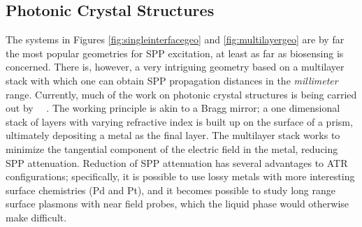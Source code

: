 \subsection{Photonic Crystal Structures}
The systems in Figures \ref{fig:singleinterfacegeo} and
\ref{fig:multilayergeo} are by far the most popular geometries for SPP
excitation, at least as far as biosensing is concerned.  There
is, however, a very intriguing geometry based on a multilayer stack with
which one can obtain SPP propagation distances in the \textit{millimeter}
range.  Currently, much of the work on photonic crystal structures is being carried
out by ~\cite{konopsky2006long}~\cite{konopsky2009long}.
The working principle is akin to a Bragg mirror; a one dimensional stack of
layers with varying refractive index is built up on the surface of a prism,
ultimately depositing a metal as the final layer.  The multilayer stack
works to minimize the tangential component of the electric field in the
metal, reducing SPP attenuation.  Reduction of SPP attenuation has several
advantages to ATR configurations; specifically, it is possible to use lossy metals with
more interesting surface chemistries (Pd and Pt), and it becomes possible
to study long range surface plasmons with near field probes, which the
liquid phase would otherwise make difficult.
